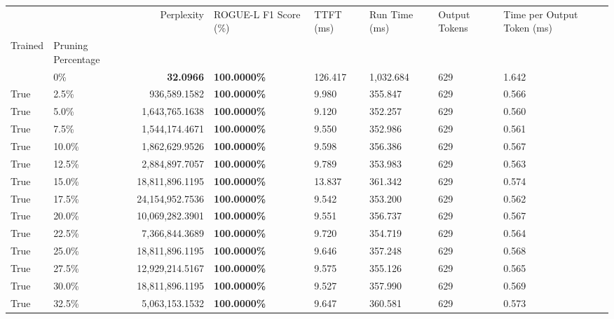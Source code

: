 \begin{table}[H]
\label{tab:evaluation-pipeline-1-trained}
\begin{tabular}{|m{} | m{} | r | R{0.13\textwidth} | R{0.09\textwidth} | R{0.09\textwidth} | R{0.09\textwidth} | R{0.11\textwidth} |}
\toprule
 &  & Perplexity & ROGUE-L F1 Score (\%) & TTFT (ms) & Run Time (ms) & Output Tokens & Time per Output Token (ms) \\
Trained & Pruning Percentage &  &  &  &  &  &  \\
\midrule
 & 0\% & \bfseries 32.0966 & \bfseries 100.0000\% & 126.417 & 1,032.684 & 629 & 1.642 \\
True & 2.5\% & \color{red} 936,589.1582 & \bfseries \color{red} 100.0000\% & 9.980 & 355.847 & 629 & 0.566 \\
True & 5.0\% & 1,643,765.1638 & \bfseries \color{red} 100.0000\% & 9.120 & 352.257 & 629 & 0.560 \\
True & 7.5\% & 1,544,174.4671 & \bfseries \color{red} 100.0000\% & 9.550 & 352.986 & 629 & 0.561 \\
True & 10.0\% & 1,862,629.9526 & \bfseries \color{red} 100.0000\% & 9.598 & 356.386 & 629 & 0.567 \\
True & 12.5\% & 2,884,897.7057 & \bfseries \color{red} 100.0000\% & 9.789 & 353.983 & 629 & 0.563 \\
True & 15.0\% & 18,811,896.1195 & \bfseries \color{red} 100.0000\% & 13.837 & 361.342 & 629 & 0.574 \\
True & 17.5\% & 24,154,952.7536 & \bfseries \color{red} 100.0000\% & 9.542 & 353.200 & 629 & 0.562 \\
True & 20.0\% & 10,069,282.3901 & \bfseries \color{red} 100.0000\% & 9.551 & 356.737 & 629 & 0.567 \\
True & 22.5\% & 7,366,844.3689 & \bfseries \color{red} 100.0000\% & 9.720 & 354.719 & 629 & 0.564 \\
True & 25.0\% & 18,811,896.1195 & \bfseries \color{red} 100.0000\% & 9.646 & 357.248 & 629 & 0.568 \\
True & 27.5\% & 12,929,214.5167 & \bfseries \color{red} 100.0000\% & 9.575 & 355.126 & 629 & 0.565 \\
True & 30.0\% & 18,811,896.1195 & \bfseries \color{red} 100.0000\% & 9.527 & 357.990 & 629 & 0.569 \\
True & 32.5\% & 5,063,153.1532 & \bfseries \color{red} 100.0000\% & 9.647 & 360.581 & 629 & 0.573 \\

\end{tabular}
\end{table}
